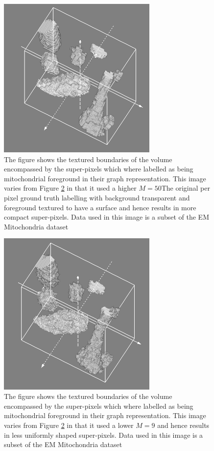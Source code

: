 \begin{figure}[H]
  \centering
  \includegraphics[width=0.7\textwidth]{images/mitochon_s10_m50.png}
  \caption{ The figure shows the textured boundaries of the volume encompassed by the super-pixels which where labelled as being mitochondrial foreground in their graph representation. This image varies from Figure \ref{fig:showingMmitochonM9} in that it used a higher $M=50$The original per pixel ground truth labelling with background transparent and foreground textured to have a surface and hence results in more compact super-pixels. Data used in this image is a subset of the EM Mitochondria dataset \cite{mitochondriaData}} 
  \label{fig:showingMmitochonM50}
\end{figure} 

\begin{figure}[H]
  \centering
  \includegraphics[width=0.7\textwidth]{images/mitochon_s10_m9.png}
  \caption{ The figure shows the textured boundaries of the volume encompassed by the super-pixels which where labelled as being mitochondrial foreground in their graph representation. This image varies from Figure \ref{fig:showingMmitochonM9} in that it used a lower $M=9$ and hence results in less uniformly shaped super-pixels. Data used in this image is a subset of the EM Mitochondria dataset \cite{mitochondriaData}} 
  \label{fig:showingMmitochonM9}
\end{figure} 
